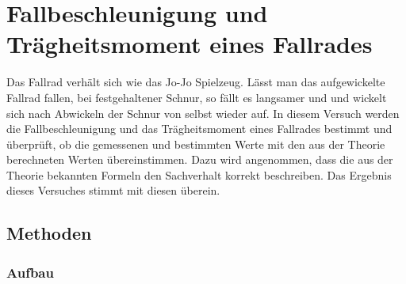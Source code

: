 \section{Fallbeschleunigung und Trägheitsmoment eines Fallrades} 

Das Fallrad verhält sich wie das Jo-Jo Spielzeug. Lässt man das aufgewickelte Fallrad fallen, bei festgehaltener Schnur, so fällt es langsamer und und wickelt sich nach Abwickeln der Schnur von selbst wieder auf. In diesem Versuch werden die Fallbeschleunigung und das Trägheitsmoment eines Fallrades bestimmt und überprüft, ob die gemessenen und bestimmten Werte mit den aus der Theorie berechneten Werten übereinstimmen. Dazu wird angenommen, dass die aus der Theorie bekannten Formeln den Sachverhalt korrekt beschreiben. Das Ergebnis dieses Versuches stimmt mit diesen überein. 

\subsection{Methoden}

\subsubsection{Aufbau}

